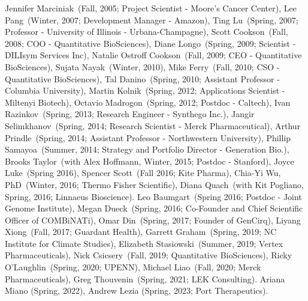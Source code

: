 Jennifer Marciniak~(Fall, 2005; Project Scientist - Moore's Cancer Center), Lee Pang~(Winter, 2007; Development Manager - Amazon), Ting Lu~(Spring, 2007; Professor - University of Illinois - Urbana-Champagne), Scott Cookson~(Fall, 2008; COO - Quantitative BioSciences), Diane Longo~(Spring, 2009; Scientist - DILIsym Services Inc), Natalie Ostroff Cookson~(Fall, 2009; CEO - Quantitative BioSciences), Sujata Nayak~(Winter, 2010), Mike Ferry~(Fall, 2010; CSO - Quantitative BioSciences), Tal Danino~(Spring, 2010; Assistant Professor - Columbia University), Martin Kolnik~(Spring, 2012; Applications Scientist - Miltenyi Biotech), Octavio Madrogon~(Spring, 2012; Postdoc - Caltech), Ivan Razinkov~(Spring, 2013; Research Engineer - Synthego Inc.),  Jangir Selimkhanov~(Spring, 2014; Research Scientist - Merck Pharmaceutical),  Arthur Prindle~(Spring, 2014; Assistant Professor - Northwestern University), Phillip Samayoa~(Summer, 2014; Strategy and Portfolio Director - Generation Bio.),  Brooks Taylor~(with Alex Hoffmann, Winter, 2015; Postdoc - Stanford), Joyce Luke~(Spring 2016), Spencer Scott~(Fall 2016; Kite Pharma), Chia-Yi Wu, PhD~(Winter, 2016; Thermo Fisher Scientific), Diana Quach~(with Kit Pogliano, Spring, 2016; Linnaeus Bioscience). Leo Baumgart~(Spring 2016; Postdoc - Joint Genome Institute), Megan Dueck~(Spring, 2016; Co-Founder and Chief Scientific Officer of COMBiNATi), Omar Din~(Spring, 2017; Founder of GenCirq), Liyang Xiong~(Fall, 2017; Guardant Health), Garrett Graham~(Spring, 2019; NC Institute for Climate Studies), Elizabeth Stasiowski~(Summer, 2019; Vertex Pharmaceuticals), Nick Csicsery~(Fall, 2019; Quantitative BioSciences), Ricky O'Laughlin~(Spring, 2020; UPENN), Michael Liao~(Fall, 2020; Merck Pharmaceuticals), Greg Thouvenin~(Spring, 2021; LEK Consulting). Ariana Miano (Spring, 2022), Andrew Lezia (Spring, 2023; Port Therapeutics). 